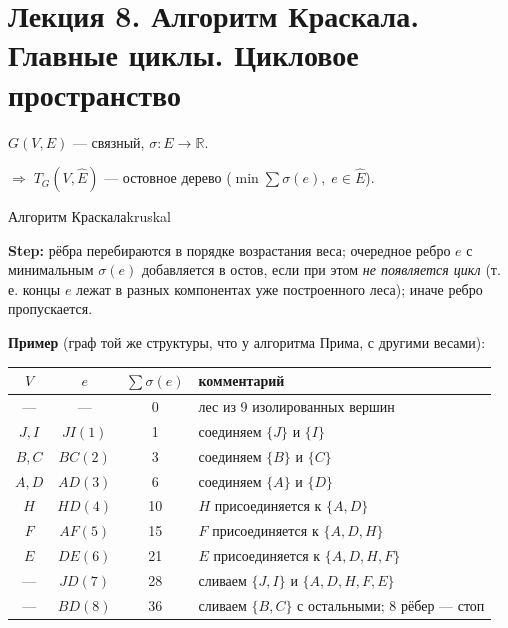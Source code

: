\chapter{Лекция 8. Алгоритм Краскала. Главные циклы. Цикловое пространство}


$G(V, E)$ --- связный, $\sigma\colon E \to \mathbb{R}$.

$\Rightarrow\; T_G(V, \hat{E})$ --- остовное дерево ($\min \sum \sigma(e),\; e \in \hat{E}$).

\begin{algo}{Алгоритм Краскала}{kruskal}

\textbf{Step:} рёбра перебираются в порядке возрастания веса; очередное
ребро $e$ с минимальным $\sigma(e)$ добавляется в остов, если при этом
\emph{не появляется цикл} (т.\,е. концы $e$ лежат в разных компонентах
уже построенного леса); иначе ребро пропускается.

\medskip
\noindent\textbf{Пример} (граф той же структуры, что у алгоритма Прима,
с другими весами):


\medskip
\begin{center}
\begin{tabular}{c|c|c|l}
$V$ & $e$ & $\sum \sigma(e)$ & комментарий \\ \hline
---     & ---      & 0  & лес из 9 изолированных вершин \\
$J, I$  & $JI(1)$  & 1  & соединяем $\{J\}$ и $\{I\}$ \\
$B, C$  & $BC(2)$  & 3  & соединяем $\{B\}$ и $\{C\}$ \\
$A, D$  & $AD(3)$  & 6  & соединяем $\{A\}$ и $\{D\}$ \\
$H$     & $HD(4)$  & 10 & $H$ присоединяется к $\{A, D\}$ \\
$F$     & $AF(5)$  & 15 & $F$ присоединяется к $\{A, D, H\}$ \\
$E$     & $DE(6)$  & 21 & $E$ присоединяется к $\{A, D, H, F\}$ \\
---     & $JD(7)$  & 28 & сливаем $\{J, I\}$ и $\{A, D, H, F, E\}$ \\
---     & $BD(8)$  & 36 & сливаем $\{B, C\}$ с остальными; $8$ рёбер --- стоп \\
\end{tabular}
\end{center}


\end{algo}

